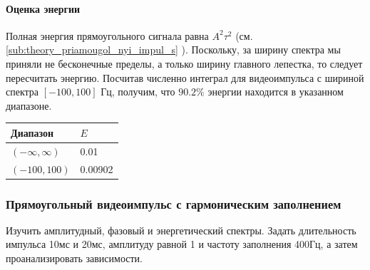 \paragraph{Оценка энергии}%
\label{par:otsenka_energii}


Полная энергия прямоугольного сигнала равна $A^2 \tau^2$  (см.
\ref{sub:theory_priamougol_nyi_impul_s} ). Поскольку, за ширину спектра мы
приняли не бесконечные пределы, а только ширину главного лепестка, то следует
пересчитать энергию. Посчитав численно интеграл для видеоимпульса с шириной
спектра $[-100, 100] \text{ Гц}$, получим, что $90.2 \%$ энергии находится в указанном
диапазоне. 


\begin{table}[H]
    \centering
    \begin{tabular}{|l|l|}
    \hline
     Диапазон & $E$ \\ \hline
     $(-\infty, \infty)$&  0.01 \\ \hline
     $(-100, 100)$&  0.00902 \\ \hline
    \end{tabular}
\end{table}

\subsubsection{Прямоугольный видеоимпульс с гармоническим заполнением}

Изучить амплитудный, фазовый и энергетический спектры. Задать
длительность импульса 10мс и 20мс, амплитуду равной 1 и частоту
заполнения 400Гц, а затем проанализировать зависимости.

